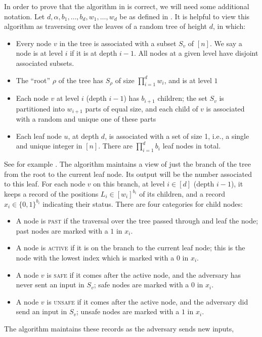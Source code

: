 \begin{itemize}
\begin{itemize}
In order to prove that the algorithm in  is correct, we will need some additional notation. Let $d,\alpha,b_1,\ldots,b_d,w_1,\ldots,w_d$ be
as defined in . It is helpful to view this algorithm as traversing over the leaves of a random tree of height $d$, in which:
\begin{itemize}
  \item Every node $v$ in the tree is associated with a subset $S_v$ of $[n]$. We say a node is at level $i$ if it is at depth $i - 1$. All nodes at a given level have disjoint associated subsets.
  \item The ``root'' $\rho$ of the tree has $S_\rho$ of size $\prod_{i=1}^{d} w_i$, and is at level $1$
  \item Each node $v$ at level $i$ (depth $i-1$) has $b_{i+1}$ children; the set $S_v$ is partitioned into $w_{i+1}$ parts of equal size, and each child of $v$ is associated with a random and unique one of these parts
  \item Each leaf node $u$, at depth $d$, is associated with a set of size 1, i.e., a single and unique integer in $[n]$. There are $\prod_{i=1}^{d} b_i$ leaf nodes in total.
\end{itemize}
See for example . The algorithm maintains a view of just the branch of the tree from the root to the current leaf node. Its output will be the number associated to this leaf. For each node $v$ on this branch, at level $i \in [d]$ (depth $i-1$), it keeps a record of the positions $L_i \in [w_i]^{b_i}$ of its children, and a record $x_i \in \{0,1\}^{b_i}$ indicating their status. There are four categories for child nodes:
\begin{itemize}
\item A node is \textsc{past} if the traversal over the tree passed through and leaf the node; past nodes are marked with a $1$ in $x_i$.
\item A node is \textsc{active} if it is on the branch to the current leaf node; this is the node with the lowest index which is marked with a $0$ in $x_i$.
\item A node $v$ is \textsc{safe} if it comes after the active node, and the adversary has never sent an input in $S_v$; safe nodes are marked with a $0$ in $x_i$.
\item A node $v$ is \textsc{unsafe} if it comes after the active node, and the adversary did send an input in $S_v$; unsafe nodes are marked with a $1$ in $x_i$.
\end{itemize}
The algorithm maintains these records as the adversary sends new inputs,

\end{itemize}
\end{itemize}
